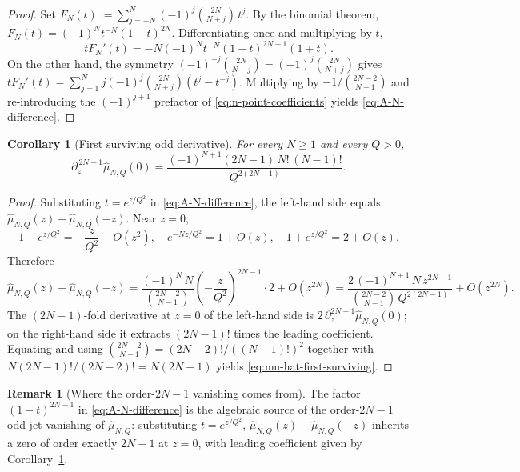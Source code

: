 \documentclass[11pt,a4paper]{amsart}
\numberwithin{equation}{section}
\theoremstyle{plain}
\newtheorem{corollary}[theorem]{Corollary}
\theoremstyle{definition}
\newtheorem{remark}[theorem]{Remark}
\begin{document}
\begin{proof}
Set \(F_N(t):=\sum_{j=-N}^N(-1)^j\binom{2N}{N+j}\,t^j\).  By the
binomial theorem, \(F_N(t)=(-1)^N t^{-N}(1-t)^{2N}\).  Differentiating
once and multiplying by \(t\),
\[
        t F_N'(t) = -N(-1)^N t^{-N}(1-t)^{2N-1}(1+t).
\]
On the other hand, the symmetry
\((-1)^{-j}\binom{2N}{N-j}=(-1)^j\binom{2N}{N+j}\) gives
\(tF_N'(t)=\sum_{j=1}^N j(-1)^j\binom{2N}{N+j}(t^j - t^{-j})\).
Multiplying by \(-1/\binom{2N-2}{N-1}\) and re-introducing the
\((-1)^{j+1}\) prefactor of \eqref{eq:n-point-coefficients} yields
\eqref{eq:A-N-difference}.
\end{proof}

\begin{corollary}[First surviving odd derivative]
\label{cor:n-point-first-surviving}
For every \(N\ge 1\) and every \(Q>0\),
\begin{equation}
\label{eq:mu-hat-first-surviving}
        \partial_z^{\,2N-1}\widehat\mu_{N,Q}(0)
        = \frac{(-1)^{N+1}(2N-1)\,N!\,(N-1)!}{Q^{2(2N-1)}}.
\end{equation}
\end{corollary}

\begin{proof}
Substituting \(t=e^{z/Q^2}\) in \eqref{eq:A-N-difference}, the
left-hand side equals
\(\widehat\mu_{N,Q}(z)-\widehat\mu_{N,Q}(-z)\).  Near \(z=0\),
\[
        1-e^{z/Q^2}=-\frac{z}{Q^2}+O(z^2),\quad
        e^{-Nz/Q^2}=1+O(z),\quad
        1+e^{z/Q^2}=2+O(z).
\]
Therefore
\[
        \widehat\mu_{N,Q}(z)-\widehat\mu_{N,Q}(-z)
        = \frac{(-1)^N\,N}{\binom{2N-2}{N-1}}\!
          \left(-\frac{z}{Q^2}\right)^{\!2N-1}\!\!\!\cdot 2
          + O(z^{2N})
        = \frac{2\,(-1)^{N+1}\,N\,z^{2N-1}}
               {\binom{2N-2}{N-1}\,Q^{2(2N-1)}}+O(z^{2N}).
\]
The \((2N-1)\)-fold derivative at \(z=0\) of the left-hand side is
\(2\,\partial_z^{2N-1}\widehat\mu_{N,Q}(0)\); on the right-hand side it
extracts \((2N-1)!\) times the leading coefficient.  Equating and using
\(\binom{2N-2}{N-1}=(2N-2)!/((N-1)!)^2\) together with
\(N(2N-1)!/(2N-2)!=N(2N-1)\) yields
\eqref{eq:mu-hat-first-surviving}.
\end{proof}

\begin{remark}[Where the order-\(2N-1\) vanishing comes from]
\label{rem:n-point-2N-minus-1-source}
The factor \((1-t)^{2N-1}\) in \eqref{eq:A-N-difference} is the
algebraic source of the order-\(2N-1\) odd-jet vanishing of
\(\widehat\mu_{N,Q}\): substituting \(t=e^{z/Q^2}\),
\(\widehat\mu_{N,Q}(z) - \widehat\mu_{N,Q}(-z)\) inherits a zero of
order exactly \(2N-1\) at \(z=0\), with leading coefficient given by
Corollary~\ref{cor:n-point-first-surviving}.
\end{remark}
\end{document}
